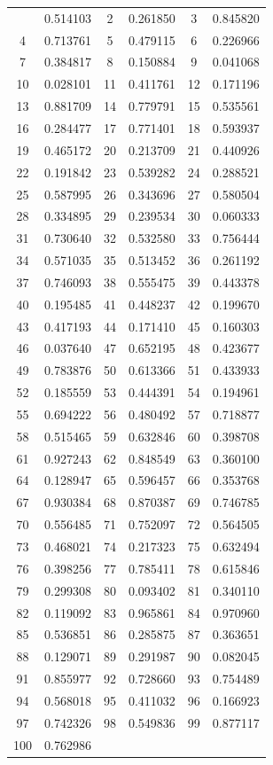 \documentclass[12pt]{article}
\begin{document}
\begin{longtable}{@{}cc|cc|cc@{}}
\bottomrule
\endlastfoot
1 & 0.514103 & 2 & 0.261850 & 3 & 0.845820 \\
4 & 0.713761 & 5 & 0.479115 & 6 & 0.226966 \\
7 & 0.384817 & 8 & 0.150884 & 9 & 0.041068 \\
10 & 0.028101 & 11 & 0.411761 & 12 & 0.171196 \\
13 & 0.881709 & 14 & 0.779791 & 15 & 0.535561 \\
16 & 0.284477 & 17 & 0.771401 & 18 & 0.593937 \\
19 & 0.465172 & 20 & 0.213709 & 21 & 0.440926 \\
22 & 0.191842 & 23 & 0.539282 & 24 & 0.288521 \\
25 & 0.587995 & 26 & 0.343696 & 27 & 0.580504 \\
28 & 0.334895 & 29 & 0.239534 & 30 & 0.060333 \\
31 & 0.730640 & 32 & 0.532580 & 33 & 0.756444 \\
34 & 0.571035 & 35 & 0.513452 & 36 & 0.261192 \\
37 & 0.746093 & 38 & 0.555475 & 39 & 0.443378 \\
40 & 0.195485 & 41 & 0.448237 & 42 & 0.199670 \\
43 & 0.417193 & 44 & 0.171410 & 45 & 0.160303 \\
46 & 0.037640 & 47 & 0.652195 & 48 & 0.423677 \\
49 & 0.783876 & 50 & 0.613366 & 51 & 0.433933 \\
52 & 0.185559 & 53 & 0.444391 & 54 & 0.194961 \\
55 & 0.694222 & 56 & 0.480492 & 57 & 0.718877 \\
58 & 0.515465 & 59 & 0.632846 & 60 & 0.398708 \\
61 & 0.927243 & 62 & 0.848549 & 63 & 0.360100 \\
64 & 0.128947 & 65 & 0.596457 & 66 & 0.353768 \\
67 & 0.930384 & 68 & 0.870387 & 69 & 0.746785 \\
70 & 0.556485 & 71 & 0.752097 & 72 & 0.564505 \\
73 & 0.468021 & 74 & 0.217323 & 75 & 0.632494 \\
76 & 0.398256 & 77 & 0.785411 & 78 & 0.615846 \\
79 & 0.299308 & 80 & 0.093402 & 81 & 0.340110 \\
82 & 0.119092 & 83 & 0.965861 & 84 & 0.970960 \\
85 & 0.536851 & 86 & 0.285875 & 87 & 0.363651 \\
88 & 0.129071 & 89 & 0.291987 & 90 & 0.082045 \\
91 & 0.855977 & 92 & 0.728660 & 93 & 0.754489 \\
94 & 0.568018 & 95 & 0.411032 & 96 & 0.166923 \\
97 & 0.742326 & 98 & 0.549836 & 99 & 0.877117 \\
100 & 0.762986 &  &  &  &  \\

\end{longtable}
\end{document}
